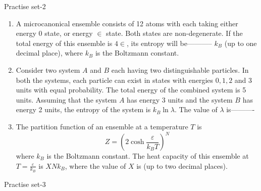 \newpage
\begin{abox}
	Practise set-2
\end{abox}
\begin{enumerate}
\item A microcanonical ensemble consists of 12 atoms with each taking either energy 0 state, or energy $\in$ state. Both states are non-degenerate. If the total energy of this ensemble is $4 \in$, its entropy will be----------- $k_{B}$ (up to one decimal place), where $k_{B}$ is the Boltzmann constant.
{}
\item Consider two system $A$ and $B$ each having two distinguishable particles. In both the systems, each particle can exist in states with energies $0,1,2$ and 3 units with equal probability. The total energy of the combined system is 5 units. Assuming that the system $A$ has energy 3 units and the system $B$ has energy 2 units, the entropy of the system is $k_{B} \ln \lambda$. The value of $\lambda$ is----------
{}
\item The partition function of an ensemble at a temperature $T$ is
$$
Z=\left(2 \cosh \frac{\varepsilon}{k_{B} T}\right)^{N}
$$
where $k_{B}$ is the Boltzmann constant. The heat capacity of this ensemble at $T=\frac{\varepsilon}{k_{B}}$ is $X N k_{B}$, where the value of $X$ is (up to two decimal places).
{}
\end{enumerate}
\newpage
\begin{abox}
	Practise set-3
\end{abox}
